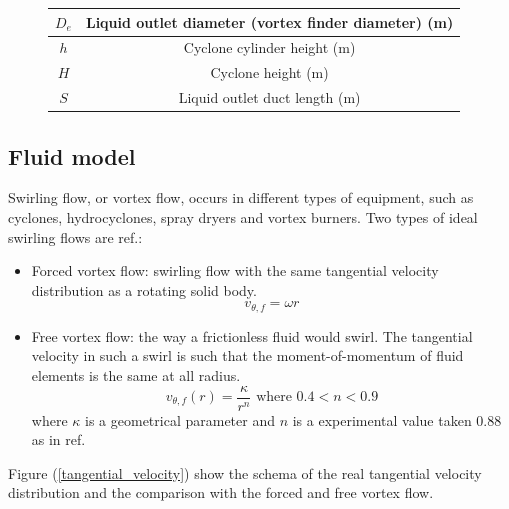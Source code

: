 \begin{figure}[H]
\begin{minipage}[b]{.59\linewidth}
\begin{tabular}{cc}
			\rule[-0.3cm]{0pt}{0.8cm}$D_e$              & Liquid outlet diameter (vortex finder diameter) (m) \\ \hline
			\rule[-0.3cm]{0pt}{0.8cm}$h$                 & Cyclone cylinder height (m)                         \\ \hline
			\rule[-0.3cm]{0pt}{0.8cm}$H$                 & Cyclone height (m)                                  \\ \hline
			\rule[-0.3cm]{0pt}{0.8cm}$S$                 & Liquid outlet duct length (m)                       \\ \hline
	\end{tabular}
		\label{variable_cyclone_description}
	\end{minipage}
\end{figure}


\subsection{Fluid model}

Swirling flow, or vortex flow, occurs in different types of equipment, such as cyclones, hydrocyclones, spray dryers and vortex burners. Two types of ideal swirling flows are ref.\cite{Marthinussen2011}: 
\begin{itemize}
	\item Forced vortex flow: swirling flow with the same tangential velocity distribution as a rotating solid body.
	\begin{equation}
		v_{\theta,f}=\omega r 
	\end{equation}
	\item Free vortex flow: the way a frictionless fluid would swirl. The tangential velocity in such a swirl is such that the moment-of-momentum of fluid elements is the same at all radius. 
	\begin{equation} \label{free_vortex_flow}
		v_{\theta,f}(r)=\frac{\kappa}{r^n} \text{  where } 0.4<n<0.9 
	\end{equation}	
	where $\kappa$ is a geometrical parameter and $n$ is a experimental value taken 0.88 as in ref.\cite{Sabbagh2014} 
\end{itemize} 
Figure (\ref{tangential_velocity}) show the schema of the real tangential velocity distribution and the comparison with the forced and free vortex flow.

